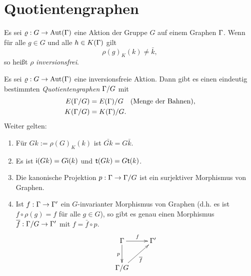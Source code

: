 \documentclass[a4paper, 12pt, twoside]{article}
\begin{document}
\section{Quotientengraphen}\label{sec_qg}

\DEF Es sei $\varrho:G\rightarrow\mathrm{Aut}(\Gamma)$ eine Aktion der Gruppe $G$ auf einem
Graphen $\Gamma$. Wenn für alle $g\in G$ und alle $h\in K(\Gamma)$ gilt
\[
\rho(g)_K(k) \neq \bar{k},
\]
so heißt $\rho$ \emph{inversionsfrei}.

\DB Es sei $\varrho:G\rightarrow\mathrm{Aut}(\Gamma)$ eine inversionsfreie Aktion.
Dann gibt es einen eindeutig bestimmten
\emph{Quotientengraphen}
$\Gamma/G$ mit
\begin{align*}
E(\Gamma/G) &= E(\Gamma)/G \quad\text{(Menge der Bahnen)},\\
K(\Gamma/G) &= K(\Gamma)/G.
\end{align*}
Weiter gelten:
\begin{enumerate}
\item Für $Gk:=\rho(G)_K(k)$
ist $\bar{Gk}=G\bar{k}$.
\item Es ist $\mathsf{i}(Gk)=G \mathsf{i}(k)$ und $\mathsf{t}(Gk)=G\mathsf{t}(k)$.
\item Die kanonische Projektion
	$p:\Gamma\rightarrow\Gamma/G$ ist ein surjektiver Morphismus von Graphen.
\item Ist $f:\Gamma\rightarrow\Gamma'$ ein $G$-invarianter Morphismus von
Graphen (d.h. es ist $f\circ\rho(g)=f$ für alle $g\in G$),
so gibt es genau einen Morphismus
$\overline{f}:\Gamma/G\rightarrow \Gamma'$ mit $f=\bar{f}\circ p$.
\[\xymatrix{
\GR \ar[r]^{f} \ar[d]_{p} & \GR' \\
\GR/G \ar[ru]_{\bar{f}} &
}\]
\end{enumerate}
\end{document}
